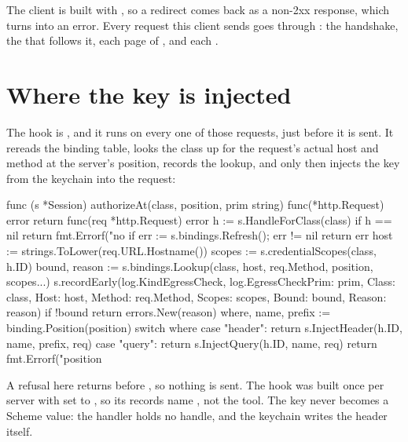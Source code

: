 The client is built with , so a redirect
comes back as a non-2xx response, which  turns into an error.
Every request this client sends goes through : the
 handshake, the  that
follows it, each page of , and each .

\section{Where the key is injected}

The  hook is , and it runs on
every one of those requests, just before it is sent. It rereads the
binding table, looks the class up for the request's actual host and method
at the server's position, records the lookup, and only then injects the key
from the keychain into the request:

\begin{go}
func (s *Session) authorizeAt(class, position, prim string) func(*http.Request) error {
    return func(req *http.Request) error {
        h := s.HandleForClass(class)
        if h == nil {
            return fmt.Errorf("no %
        }
        if err := s.bindings.Refresh(); err != nil {
            return err
        }
        host := strings.ToLower(req.URL.Hostname())
        scopes := s.credentialScopes(class, h.ID)
        bound, reason := s.bindings.Lookup(class, host, req.Method, position, scopes...)
        s.recordEarly(log.KindEgressCheck, log.EgressCheck{Prim: prim, Class: class, Host: host, Method: req.Method, Scopes: scopes, Bound: bound, Reason: reason})
        if !bound {
            return errors.New(reason)
        }
        where, name, prefix := binding.Position(position)
        switch where {
        case "header":
            return s.InjectHeader(h.ID, name, prefix, req)
        case "query":
            return s.InjectQuery(h.ID, name, req)
        }
        return fmt.Errorf("position %
    }
}
\end{go}

A refusal here returns before , so nothing is sent. The hook
was built once per server with  set to
, so its records name
, not the tool. The key never becomes a Scheme value:
the handler holds no handle, and the keychain writes the header itself.

